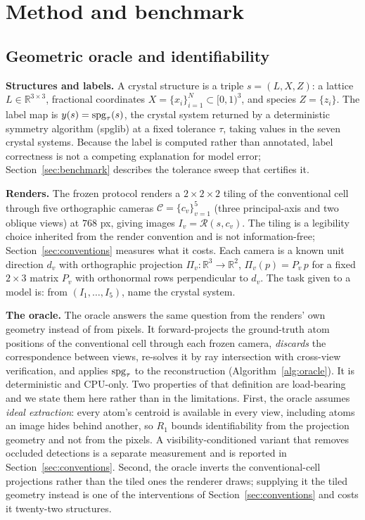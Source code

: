 \section{Method and benchmark}
\label{sec:method}

\subsection{Geometric oracle and identifiability}
\label{sec:oracle}

\textbf{Structures and labels.} A crystal structure is a triple $s = (L, X, Z)$: a lattice
$L \in \mathbb{R}^{3\times3}$, fractional coordinates $X = \{x_i\}_{i=1}^{N} \subset [0,1)^3$, and species
$Z = \{z_i\}$. The label map is $y(s) = \mathrm{spg}_\tau(s)$, the crystal system returned by a deterministic symmetry
algorithm (spglib) at a fixed tolerance $\tau$, taking values in the seven crystal systems. Because the
label is computed rather than annotated, label correctness is not a competing explanation for model error;
Section~\ref{sec:benchmark} describes the tolerance sweep that certifies it.

\textbf{Renders.} The frozen protocol renders a $2\times2\times2$ tiling of the conventional cell through
five orthographic cameras $\mathcal{C} = \{c_v\}_{v=1}^{5}$ (three principal-axis and two oblique views) at
$768$ px, giving images $I_v = \mathcal{R}(s, c_v)$. The tiling is a legibility choice inherited from the
render convention and is not information-free; Section~\ref{sec:conventions} measures what it costs. Each camera is a known unit direction $d_v$ with orthographic projection
$\Pi_v : \mathbb{R}^3 \to \mathbb{R}^2$, $\Pi_v(p) = P_v\, p$ for a fixed $2\times3$ matrix $P_v$ with
orthonormal rows perpendicular to $d_v$. The task given to a model is: from $(I_1,\dots,I_5)$, name the
crystal system.

\textbf{The oracle.} The oracle answers the same question from the renders' own geometry instead of from
pixels. It forward-projects the ground-truth atom positions of the conventional cell through each frozen
camera, \emph{discards} the correspondence between views, re-solves it by ray intersection with cross-view
verification, and applies $\mathrm{spg}_\tau$ to the reconstruction (Algorithm~\ref{alg:oracle}). It is deterministic
and CPU-only. Two properties of that definition are load-bearing and we state them here rather than in the
limitations. First, the oracle assumes \emph{ideal extraction}: every atom's centroid is available in every
view, including atoms an image hides behind another, so $R_1$ bounds identifiability from the projection
geometry and not from the pixels. A visibility-conditioned variant that removes occluded detections is a
separate measurement and is reported in Section~\ref{sec:conventions}. Second, the oracle inverts the
conventional-cell projections rather than the tiled ones the renderer draws; supplying it the tiled geometry
instead is one of the interventions of Section~\ref{sec:conventions} and costs it twenty-two structures.

